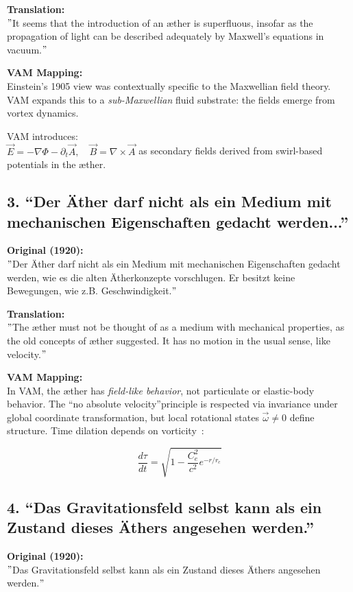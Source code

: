 \documentclass[preprint]{revtex4-2}
\renewcommand{\grqq}{``}
\begin{document}
    \textbf{Translation:} \\
    \("\)It seems that the introduction of an æther is superfluous, insofar as the propagation of light can be described adequately by Maxwell's equations in vacuum.\("\)

    \textbf{VAM Mapping:} \\
    Einstein's 1905 view was contextually specific to the Maxwellian field theory. VAM expands this to a \emph{sub-Maxwellian} fluid substrate: the fields emerge from vortex dynamics.

    VAM introduces: \\
    \( \vec{E} = -\nabla \Phi - \partial_t \vec{A}, \quad \vec{B} = \nabla \times \vec{A} \) as secondary fields derived from swirl-based potentials in the æther.

    \subsection*{3. \grqq Der Äther darf nicht als ein Medium mit mechanischen Eigenschaften gedacht werden...\textquotedblright}
    \textbf{Original (1920):} \\
    \("\)Der Äther darf nicht als ein Medium mit mechanischen Eigenschaften gedacht werden, wie es die alten Ätherkonzepte vorschlugen. Er besitzt keine Bewegungen, wie z.B. Geschwindigkeit.\("\)

    \textbf{Translation:} \\
    \("\)The æther must not be thought of as a medium with mechanical properties, as the old concepts of æther suggested. It has no motion in the usual sense, like velocity.\("\)

    \textbf{VAM Mapping:} \\
    In VAM, the æther has \emph{field-like behavior}, not particulate or elastic-body behavior. The \grqq no absolute velocity\textquotedblright principle is respected via invariance under global coordinate transformation, but local rotational states \( \vec{\omega} \neq 0 \) define structure. Time dilation depends on vorticity~\cite{iskandarani2025vam2}:

    \[
    \frac{d\tau}{dt} = \sqrt{1 - \frac{C_e^2}{c^2} e^{-r/r_c}}
    \]

    \subsection*{4. \grqq Das Gravitationsfeld selbst kann als ein Zustand dieses Äthers angesehen werden.\textquotedblright}
    \textbf{Original (1920):} \\
    \("\)Das Gravitationsfeld selbst kann als ein Zustand dieses Äthers angesehen werden.\("\)
\end{document}
